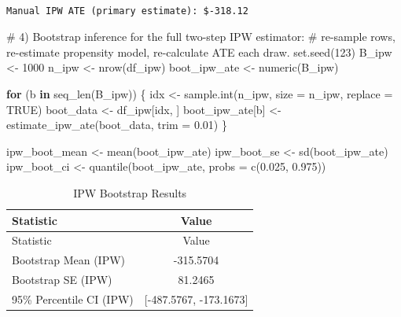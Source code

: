 \documentclass[
  letterpaper,
  DIV=11,
  numbers=noendperiod]{scrartcl}
\newenvironment{Shaded}{\begin{snugshade}}{\end{snugshade}}
\newcommand{\AttributeTok}[1]{\textcolor[rgb]{0.40,0.45,0.13}{#1}}
\newcommand{\CommentTok}[1]{\textcolor[rgb]{0.37,0.37,0.37}{#1}}
\newcommand{\ConstantTok}[1]{\textcolor[rgb]{0.56,0.35,0.01}{#1}}
\newcommand{\ControlFlowTok}[1]{\textcolor[rgb]{0.00,0.23,0.31}{\textbf{#1}}}
\newcommand{\DecValTok}[1]{\textcolor[rgb]{0.68,0.00,0.00}{#1}}
\newcommand{\FloatTok}[1]{\textcolor[rgb]{0.68,0.00,0.00}{#1}}
\newcommand{\FunctionTok}[1]{\textcolor[rgb]{0.28,0.35,0.67}{#1}}
\newcommand{\NormalTok}[1]{\textcolor[rgb]{0.00,0.23,0.31}{#1}}
\newcommand{\OtherTok}[1]{\textcolor[rgb]{0.00,0.23,0.31}{#1}}
\begin{document}
\begin{verbatim}

Manual IPW ATE (primary estimate): $-318.12
\end{verbatim}

\begin{Shaded}
\begin{Highlighting}[]
\CommentTok{\# 4) Bootstrap inference for the full two{-}step IPW estimator:}
\CommentTok{\#    re{-}sample rows, re{-}estimate propensity model, re{-}calculate ATE each draw.}
\FunctionTok{set.seed}\NormalTok{(}\DecValTok{123}\NormalTok{)}
\NormalTok{B\_ipw }\OtherTok{\textless{}{-}} \DecValTok{1000}
\NormalTok{n\_ipw }\OtherTok{\textless{}{-}} \FunctionTok{nrow}\NormalTok{(df\_ipw)}
\NormalTok{boot\_ipw\_ate }\OtherTok{\textless{}{-}} \FunctionTok{numeric}\NormalTok{(B\_ipw)}

\ControlFlowTok{for}\NormalTok{ (b }\ControlFlowTok{in} \FunctionTok{seq\_len}\NormalTok{(B\_ipw)) \{}
\NormalTok{  idx }\OtherTok{\textless{}{-}} \FunctionTok{sample.int}\NormalTok{(n\_ipw, }\AttributeTok{size =}\NormalTok{ n\_ipw, }\AttributeTok{replace =} \ConstantTok{TRUE}\NormalTok{)}
\NormalTok{  boot\_data }\OtherTok{\textless{}{-}}\NormalTok{ df\_ipw[idx, ]}
\NormalTok{  boot\_ipw\_ate[b] }\OtherTok{\textless{}{-}} \FunctionTok{estimate\_ipw\_ate}\NormalTok{(boot\_data, }\AttributeTok{trim =} \FloatTok{0.01}\NormalTok{)}
\NormalTok{\}}

\NormalTok{ipw\_boot\_mean }\OtherTok{\textless{}{-}} \FunctionTok{mean}\NormalTok{(boot\_ipw\_ate)}
\NormalTok{ipw\_boot\_se }\OtherTok{\textless{}{-}} \FunctionTok{sd}\NormalTok{(boot\_ipw\_ate)}
\NormalTok{ipw\_boot\_ci }\OtherTok{\textless{}{-}} \FunctionTok{quantile}\NormalTok{(boot\_ipw\_ate, }\AttributeTok{probs =} \FunctionTok{c}\NormalTok{(}\FloatTok{0.025}\NormalTok{, }\FloatTok{0.975}\NormalTok{))}
\end{Highlighting}
\end{Shaded}

\begin{longtable}[]{@{}lc@{}}
\caption{IPW Bootstrap Results}\tabularnewline
\toprule\noalign{}
Statistic & Value \\
\midrule\noalign{}
\endfirsthead
\toprule\noalign{}
Statistic & Value \\
\midrule\noalign{}
\endhead
\bottomrule\noalign{}
\endlastfoot
Bootstrap Mean (IPW) & -315.5704 \\
Bootstrap SE (IPW) & 81.2465 \\
95\% Percentile CI (IPW) & {[}-487.5767, -173.1673{]} \\
\end{longtable}
\end{document}
